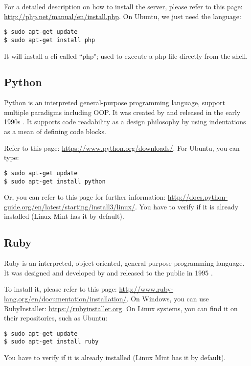 \documentclass{KodeBookAr}
\begin{document}
For a detailed description on how to install the server, please refer to this page: \url{http://php.net/manual/en/install.php}.
On Ubuntu, we just need the language:
\begin{lstlisting}[style=shellStyle]
$ sudo apt-get update
$ sudo apt-get install php
\end{lstlisting}
It will install a \ac{cli} called ``php"; used to execute a php file directly from the shell.

\subsection{Python}


Python is an interpreted general-purpose programming language, support multiple paradigms including OOP. 
It was created by  and released in the early 1990s \cite{2018-python2.7}.
It supports code readability as a design philosophy by using indentations as a mean of defining code blocks.

Refer to this page: \url{https://www.python.org/downloads/}. 
For Ubuntu, you can type:
\begin{lstlisting}[style=shellStyle]
$ sudo apt-get update
$ sudo apt-get install python
\end{lstlisting}
Or, you can refer to this page for further information: \url{http://docs.python-guide.org/en/latest/starting/install3/linux/}.
You have to verify if it is already installed (Linux Mint has it by default).

\subsection{Ruby}


Ruby is an interpreted, object-oriented, general-purpose programming language. 
It was designed and developed by  and released to the public in 1995 \citep{2001-thomas-hunt}.

To install it, please refer to this page: \url{http://www.ruby-lang.org/en/documentation/installation/}. 
On Windows, you can use RubyInstaller: \url{https://rubyinstaller.org}.
On Linux systems, you can find it on their repositories, such as Ubuntu:
\begin{lstlisting}[style=shellStyle]
$ sudo apt-get update
$ sudo apt-get install ruby
\end{lstlisting}
You have to verify if it is already installed (Linux Mint has it by default).
\end{document}
